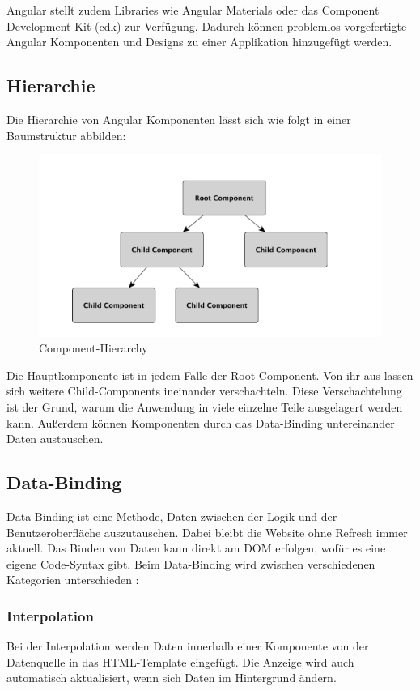 Angular stellt zudem Libraries wie Angular Materials oder das Component Development Kit (cdk) zur Verfügung. Dadurch können problemlos vorgefertigte Angular Komponenten und Designs zu einer Applikation hinzugefügt werden.

\subsection{Hierarchie}
Die Hierarchie von Angular Komponenten lässt sich wie folgt in einer Baumstruktur abbilden:

\begin{figure} [h t]
    \centering
    \includegraphics[scale=0.6]{pics/hierarchy.PNG}
    \caption{Component-Hierarchy \cite{AngularBuch}}
    \label{fig:tech:front:component-hierarchy}
  \end{figure}
Die Hauptkomponente ist in jedem Falle der Root-Component. Von ihr aus lassen sich weitere Child-Components ineinander verschachteln. Diese Verschachtelung ist der Grund, warum die Anwendung in viele einzelne Teile ausgelagert werden kann. Außerdem können Komponenten durch das Data-Binding untereinander Daten austauschen.

\subsection{Data-Binding }
Data-Binding ist eine Methode, Daten zwischen der Logik und der Benutzeroberfläche auszutauschen. Dabei bleibt die Website ohne Refresh immer aktuell. Das Binden von Daten kann direkt am DOM erfolgen, wofür es eine eigene Code-Syntax gibt. Beim Data-Binding wird zwischen  verschiedenen Kategorien unterschieden \cite{AngularBuch} \cite{BindingSyntax}:  
    

\subsubsection{Interpolation}
Bei der Interpolation werden Daten innerhalb einer Komponente von der Datenquelle in das HTML-Template eingefügt. Die Anzeige wird auch automatisch aktualisiert, wenn sich Daten im Hintergrund ändern.

